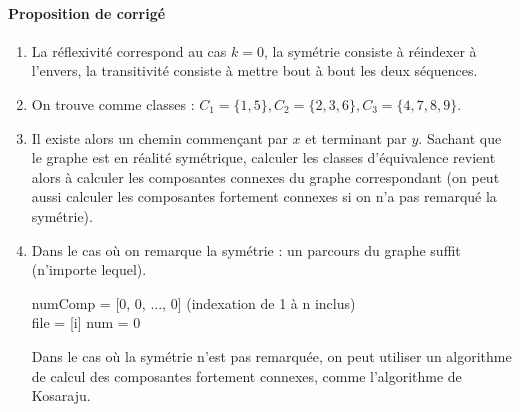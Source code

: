 \documentclass{ccinp}
\begin{document}
\newpage


\paragraph*{Proposition de corrigé}
    
  \begin{enumerate}
      \item  La réflexivité correspond au cas $k=0$, la symétrie consiste à réindexer à l'envers, la transitivité
         consiste à mettre bout à bout les deux séquences. 

     \item On trouve comme classes : $C_1 = \{1,5\}, C_2 = \{2,3,6\}, C_3 = \{4,7,8,9\}$.
  
     \item Il existe alors un chemin commençant par $x$ et terminant par $y$.   Sachant que le graphe est en réalité symétrique, calculer les classes d'équivalence revient alors à calculer les composantes connexes du graphe correspondant (on peut aussi calculer les composantes fortement connexes si on n'a pas remarqué la symétrie).  

     \item Dans le cas où on remarque la symétrie : un parcours du graphe suffit (n'importe lequel).

\begin{pcode-env}
  numComp = [0, 0, ..., 0] (indexation de 1 à n inclus)\\
       \;
       file = [i] \;
  num = 0 \;
  {
  }
     
\end{pcode-env}

Dans le cas où la symétrie n'est pas remarquée, on peut utiliser un algorithme de calcul des composantes fortement connexes, comme l'algorithme de Kosaraju. 




\end{enumerate}
\end{document}
